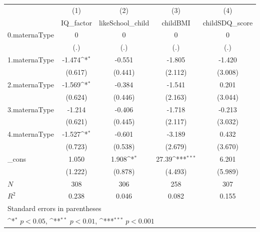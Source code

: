 {
\def\sym#1{\ifmmode^{#1}\else\(^{#1}\)\fi}
\begin{tabular}{l*{4}{c}}
\toprule
            &\multicolumn{1}{c}{(1)}&\multicolumn{1}{c}{(2)}&\multicolumn{1}{c}{(3)}&\multicolumn{1}{c}{(4)}\\
            &\multicolumn{1}{c}{IQ\_factor}&\multicolumn{1}{c}{likeSchool\_child}&\multicolumn{1}{c}{childBMI}&\multicolumn{1}{c}{childSDQ\_score}\\
\midrule
0.maternaType&           0         &           0         &           0         &           0         \\
            &         (.)         &         (.)         &         (.)         &         (.)         \\
\addlinespace
1.maternaType&      -1.474\sym{*}  &      -0.551         &      -1.805         &      -1.420         \\
            &     (0.617)         &     (0.441)         &     (2.112)         &     (3.008)         \\
\addlinespace
2.maternaType&      -1.569\sym{*}  &      -0.384         &      -1.541         &       0.201         \\
            &     (0.624)         &     (0.446)         &     (2.163)         &     (3.044)         \\
\addlinespace
3.maternaType&      -1.214         &      -0.406         &      -1.718         &      -0.213         \\
            &     (0.621)         &     (0.445)         &     (2.117)         &     (3.032)         \\
\addlinespace
4.maternaType&      -1.527\sym{*}  &      -0.601         &      -3.189         &       0.432         \\
            &     (0.723)         &     (0.538)         &     (2.679)         &     (3.670)         \\
\addlinespace
\_cons      &       1.050         &       1.908\sym{*}  &       27.39\sym{***}&       6.201         \\
            &     (1.222)         &     (0.878)         &     (4.493)         &     (5.989)         \\
\midrule
\(N\)       &         308         &         306         &         258         &         307         \\
\(R^{2}\)   &       0.238         &       0.046         &       0.082         &       0.155         \\
\bottomrule
\multicolumn{5}{l}{\footnotesize Standard errors in parentheses}\\
\multicolumn{5}{l}{\footnotesize \sym{*} \(p<0.05\), \sym{**} \(p<0.01\), \sym{***} \(p<0.001\)}\\
\end{tabular}
}
